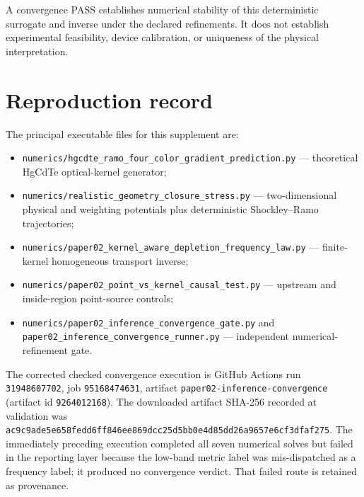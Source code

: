 \documentclass[aps,pra,onecolumn,superscriptaddress,nofootinbib]{revtex4-2}
\begin{document}
A convergence PASS establishes numerical stability of this deterministic surrogate and inverse under the declared refinements.  It does not establish experimental feasibility, device calibration, or uniqueness of the physical interpretation.

\section{Reproduction record}

The principal executable files for this supplement are:
\begin{itemize}
\item \texttt{numerics/hgcdte\_ramo\_four\_color\_gradient\_prediction.py} --- theoretical HgCdTe optical-kernel generator;
\item \texttt{numerics/realistic\_geometry\_closure\_stress.py} --- two-dimensional physical and weighting potentials plus deterministic Shockley--Ramo trajectories;
\item \texttt{numerics/paper02\_kernel\_aware\_depletion\_frequency\_law.py} --- finite-kernel homogeneous transport inverse;
\item \texttt{numerics/paper02\_point\_vs\_kernel\_causal\_test.py} --- upstream and inside-region point-source controls;
\item \texttt{numerics/paper02\_inference\_convergence\_gate.py} and \texttt{paper02\_inference\_convergence\_runner.py} --- independent numerical-refinement gate.
\end{itemize}

The corrected checked convergence execution is GitHub Actions run \texttt{31948607702}, job \texttt{95168474631}, artifact \texttt{paper02-inference-convergence} (artifact id \texttt{9264012168}).  The downloaded artifact SHA-256 recorded at validation was \texttt{ac9c9ade5e658fedd6ff846ee869dcc25d5bb0e4d85dd26a9657e6cf3dfaf275}.  The immediately preceding execution completed all seven numerical solves but failed in the reporting layer because the low-band metric label was mis-dispatched as a frequency label; it produced no convergence verdict.  That failed route is retained as provenance.



\end{document}
